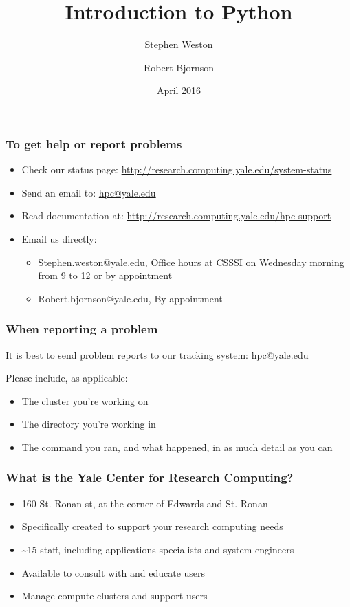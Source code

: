 \documentclass[10pt]{beamer}
\title{Introduction to Python}
\author{{Stephen Weston} \and {Robert Bjornson}}
\institute[Yale]{
  Yale Center for Research Computing \\
  Yale University
}
\date{April 2016}
\begin{document}
\begin{frame}[plain]
  \titlepage
\end{frame}

\begin{frame}[fragile]
\frametitle{To get help or report problems}
\begin{itemize}
\item Check our status page: \url{http://research.computing.yale.edu/system-status}
\item Send an email to: \url{hpc@yale.edu}
\item Read documentation at: \url{http://research.computing.yale.edu/hpc-support}
\item Email us directly:
\begin{itemize}
\item Stephen.weston@yale.edu, Office hours at CSSSI on Wednesday morning from 9 to 12 or by appointment
\item Robert.bjornson@yale.edu, By appointment
\end{itemize}
\end{itemize}
\end{frame}

\begin{frame}[fragile]
\frametitle{When reporting a problem}
It is best to send problem reports to our tracking system: hpc@yale.edu 
\vspace{2mm}

Please include, as applicable:
\begin{itemize}
\item The cluster you're working on
\item The directory you're working in
\item The command you ran, and what happened, in as much detail as you can
\end{itemize}
\end{frame}

\begin{frame}[fragile]
\frametitle{What is the Yale Center for Research Computing?}

\begin{itemize}
\item 160 St. Ronan st, at the corner of Edwards and St. Ronan
\item Specifically created to support your research computing needs
\item \textasciitilde 15 staff, including applications specialists and system engineers
\item Available to consult with and educate users
\item Manage compute clusters and support users
\end{itemize}
\end{frame}
\end{document}
